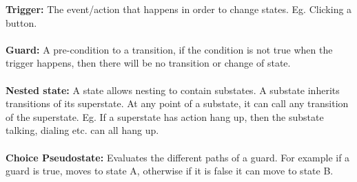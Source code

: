 \documentclass[a4paper,10pt]{article}
\begin{document}
\textcolor{Cerulean}{\textbf{Trigger:}} The event/action that happens in order to change states. Eg. Clicking a button.\\\\
\textcolor{Cerulean}{\textbf{Guard:}} A pre-condition to a transition, if the condition is not true when the trigger happens, then there will be no transition or change of state.\\\\
\textcolor{Cerulean}{\textbf{Nested state:}} A state allows nesting to contain substates. A substate inherits transitions of its superstate. At any point of a substate, it can call any transition of the superstate. Eg. If a superstate has action hang up, then the substate talking, dialing etc. can all hang up.\\\\
\textcolor{Cerulean}{\textbf{Choice Pseudostate:}} Evaluates the different paths of a guard. For example if a guard is true, moves to state A, otherwise if it is false it can move to state B. \\\\
\newpage 
\end{document}
